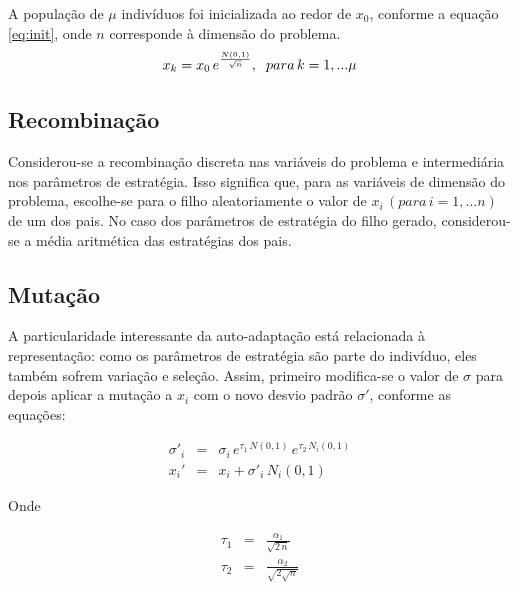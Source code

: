 \documentclass[conference,compsoc]{IEEEtran}
\begin{document}
 A população de $\mu$ indivíduos foi inicializada ao redor de $x_0$, conforme a equação \ref{eq:init}, onde $n$ corresponde à dimensão do problema.\\
 
 \begin{equation}
 x_k = x_0 \, e^{\frac{N(0,1)}{\sqrt{n}}}, \hspace{0.2cm} para \, k=1,...\mu
 \label{eq:init}
 \end{equation}
  
 \subsection{Recombinação}
    
Considerou-se a recombinação discreta nas variáveis do problema e intermediária nos parâmetros de estratégia. Isso significa que, para as variáveis de dimensão do problema, escolhe-se para o filho aleatoriamente o valor de $x_i \,(para \, i=1,...n)$ de um dos pais. No caso dos parâmetros de estratégia do filho gerado, considerou-se a média aritmética das estratégias dos pais. \\

 \subsection{Mutação}
  
A particularidade interessante da auto-adaptação está relacionada à representação: como os parâmetros de estratégia são parte do indivíduo, eles também sofrem variação e seleção.  Assim, primeiro modifica-se o valor de $\sigma$ para depois aplicar a mutação a $x_i$ com o novo desvio padrão $\sigma'$, conforme as equações:

 \begin{eqnarray}
 \sigma'_i &= &\sigma_i \, e^{\tau_1  \, N(0,1)} \,  e^{\tau_2  \, N_i(0,1)} \\ \nonumber
 x_i'&=& x_i + \sigma'_i \, N_i(0,1)
 \end{eqnarray}
 \vspace{-0.4cm}

\begin{flushleft}
Onde
\end{flushleft}	
\vspace{-0.3cm}	

\begin{eqnarray}
 \tau_1 &=& \frac{\alpha_1}{\sqrt{2\,n}}    \nonumber \\ 
 \tau_2 &=& \frac{\alpha_2}{\sqrt{2\sqrt{n}}} %
\end{eqnarray}
\end{document}
